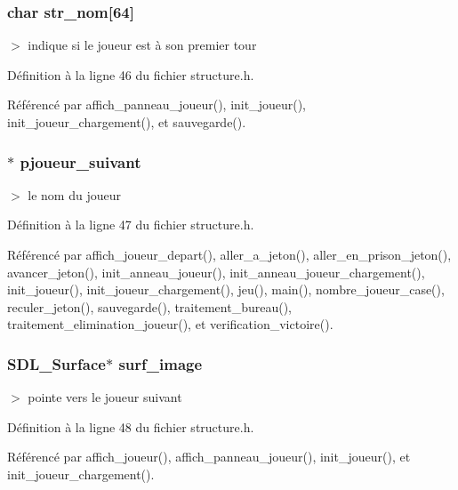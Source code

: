 \subsubsection{\setlength{\rightskip}{0pt plus 5cm}char {\bf str\_\-nom}[64]}\label{structjoueur_844787380e505616b9f1ba539febe9e0}


$>$ indique si le joueur est \`{a} son premier tour 



D\'{e}finition \`{a} la ligne 46 du fichier structure.h.

R\'{e}f\'{e}renc\'{e} par affich\_\-panneau\_\-joueur(), init\_\-joueur(), init\_\-joueur\_\-chargement(), et sauvegarde().
\subsubsection{$\ast$ {\bf pjoueur\_\-suivant}}\label{structjoueur_c1e6e55655821e532f1c4e6d67fc8d64}


$>$ le nom du joueur 



D\'{e}finition \`{a} la ligne 47 du fichier structure.h.

R\'{e}f\'{e}renc\'{e} par affich\_\-joueur\_\-depart(), aller\_\-a\_\-jeton(), aller\_\-en\_\-prison\_\-jeton(), avancer\_\-jeton(), init\_\-anneau\_\-joueur(), init\_\-anneau\_\-joueur\_\-chargement(), init\_\-joueur(), init\_\-joueur\_\-chargement(), jeu(), main(), nombre\_\-joueur\_\-case(), reculer\_\-jeton(), sauvegarde(), traitement\_\-bureau(), traitement\_\-elimination\_\-joueur(), et verification\_\-victoire().
\subsubsection{\setlength{\rightskip}{0pt plus 5cm}SDL\_\-Surface$\ast$ {\bf surf\_\-image}}\label{structjoueur_f3f87b368012a35e80ab79e151e25cfd}


$>$ pointe vers le joueur suivant 



D\'{e}finition \`{a} la ligne 48 du fichier structure.h.

R\'{e}f\'{e}renc\'{e} par affich\_\-joueur(), affich\_\-panneau\_\-joueur(), init\_\-joueur(), et init\_\-joueur\_\-chargement().
